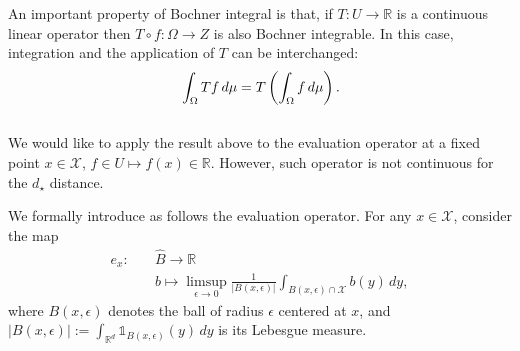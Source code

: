\documentclass[a4paper, 11pt]{article}
\theoremstyle{definition}
\newcommand{\R}{{\mathbb{R}}}
\newcommand{\cX}{{\mathcal{X}}}
\newcommand{\indi}[1]{\mathds{1}_{#1}}
\begin{document}
{An important property of Bochner integral is that, if \( T: U \rightarrow \mathbb{R} \) is a continuous linear operator
then \( T \circ f: \Omega \rightarrow Z \) is also Bochner integrable. In this case, integration and the application of \( T \) can be interchanged:
\begin{equation}{\label{eq: prop Bochner}}
	\int_{\Omega} T f \, d\mu = T \left( \int_{\Omega} f \, d\mu \right).   
\end{equation}
\\
%
We would like to apply the result above to the evaluation operator at a fixed point $x\in \cX$, $f\in U \mapsto f(x)\in \mathbb{R}$. However, such operator is not continuous for the $d_\star$ distance. 

We formally introduce %
as follows the evaluation operator. For any \( x \in \cX \), consider the map
\begin{align}\nonumber %
e_x : \quad & \widehat{B} \rightarrow \mathbb{R} \\
\label{eq : def evaluation operator}
& b \mapsto \limsup_{\epsilon \to 0} \frac{1}{|B(x, \epsilon)|} \int_{B(x, \epsilon)\cap\cX} b(y) \, dy,
\end{align}
where \( B(x, \epsilon) \) denotes the ball of radius \( \epsilon \) centered at \( x \), and \( |B(x, \epsilon)| := \int_{{\R}^d} \indi{B(x, \epsilon)}(y) \, dy \) is its Lebesgue measure. 

}
\end{document}
